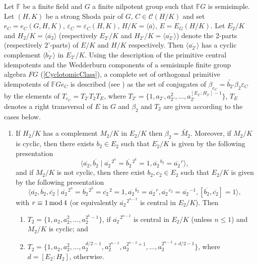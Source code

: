 \documentclass[a4paper,11pt]{report}
\begin{document}
{{ Let $\mathbb F$ be a finite field and $G$ a finite nilpotent group such that $\mathbb F G$ is semisimple. Let $(H,K)$ be a strong Shoda pair of $G$, $C\in\mathcal{C}(H/K)$ and set $e_C=e_C(G,H,K)$, $\varepsilon_C=\varepsilon_C(H,K)$, $H/K=\langle\overline{a}\rangle$, $E=E_G(H/K)$. Let $E_2/K$ and $H_2/K=\langle\overline{a_2}\rangle$ (respectively $E_{2'}/K$ and $H_{2'}/K=\langle\overline{a_{2'}}\rangle$) denote the 2-parts (respectively 2'-parts) of $E/K$ and $H/K$ respectively. Then $\langle\overline{a_{2'}}\rangle$ has a cyclic complement $\langle\overline{b_{2'}}\rangle$ in $E_{2'}/K$. Using the description of the primitive central idempotents and the
Wedderburn components of a semisimple finite group algebra $F G$ (\ref{CyclotomicClass}), a complete set of orthogonal primitive idempotents of $\mathbb F Ge_C$ is described (see \cite{OV}) as the set of conjugates of $\beta_{e_C}=\widetilde{b_{2'}}\beta_2\varepsilon_C$ by the elements of $T_{e_C}=T_{2'}T_2T_E$, where $T_{2'}=\{1,a_{2'},a_{2'}^2,\dots,a_{2'}^{[E_{2'}:H_{2'}]-1}\}$, $T_E$ denotes a right transversal of $E$ in $G$ and $\beta_2$ and $T_2$ are given according to the cases below. 
\begin{enumerate}
\item  If $H_2/K$ has a complement $M_2/K$ in $E_2/K$ then $\beta_2=\widetilde{M_2}$. Moreover, if $M_2/K$ is cyclic, then there exists $b_2\in E_2$ such that $E_2/K$ is given by the following presentation 
\[\langle \overline{a_2},\overline{b_2}\mid
\overline{a_2}\hspace{1pt}^{2^n}=\overline{b_2}\hspace{1pt}^{2^k}=1,
\overline{a_2}\hspace{1pt}^{\overline{b_2}}=\overline{a_2}\hspace{1pt}^r
\rangle,\]
 and if $M_2/K$ is not cyclic, then there exist $b_2,c_2\in E_2$ such that $E_2/K$ is given by the following presentation 
\[\langle \overline{a_2},\overline{b_2},\overline{c_2}\mid
\overline{a_2}\hspace{1pt}^{2^n}=
\overline{b_2}\hspace{1pt}^{2^k}=\overline{c_2}\hspace{1pt}^2=1,
\overline{a_2}\hspace{1pt}^{\overline{b_2}}=\overline{a_2}\hspace{1pt}^r,
\overline{a_2}\hspace{1pt}^{\overline{c_2}}=\overline{a_2}\hspace{1pt}^{-1},
[\overline{b_2},\overline{c_2}]=1 \rangle,\]
 with $r \equiv 1 {\rm \,mod\,} 4$ (or equivalently $\overline{a_2}\hspace{1pt}^{2^{n-2}}$ is central in $E_2/K$). Then 
\begin{enumerate}
\item  $T_2=\{1,a_2,a_2^2,\dots, a_2^{2^k-1}\}$, if $\overline{a_2}\hspace{1pt}^{2^{n-2}}$ is central in $E_2/K$ (unless $n\leq 1$) and $M_2/K$ is cyclic; and 
\item  $T_2=\{1,a_2,a_2^2,\dots,a_2^{d/2-1},a_2^{2^{n-2}},a_2^{2^{n-2}+1},\dots,a_2^{2^{n-2}+d/2-1}\}$, where $d=[E_2:H_2]$, otherwise. 
\end{enumerate}
 

\end{enumerate}}}
\end{document}
